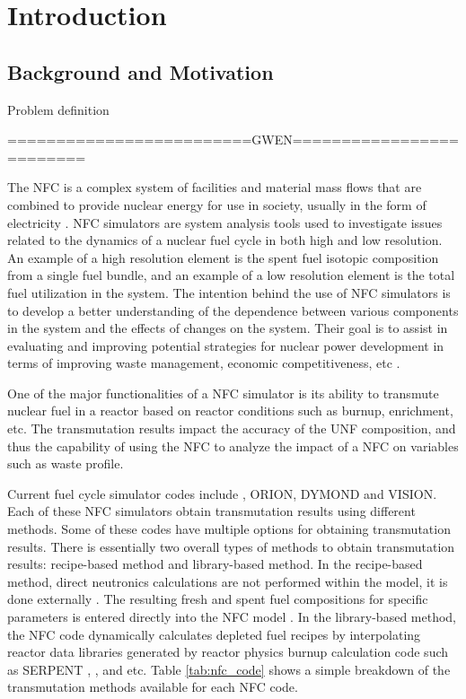 \section{Introduction}
\subsection{Background and Motivation}
Problem definition

=========================GWEN=========================

The \gls{NFC} is a complex system of facilities and material 
mass flows that are combined to provide nuclear energy for use 
in society, usually in the form of electricity 
\cite{yacout_modeling_2005}. 
\gls{NFC} simulators are system analysis tools used to investigate 
issues related to the dynamics of a nuclear fuel cycle in both 
high and low resolution. 
An example of a high resolution element is the spent fuel 
isotopic composition from a single fuel bundle, and an example 
of a low resolution element is the total fuel utilization in 
the system. 
The intention behind the use of \gls{NFC} simulators is to develop 
a better understanding of the dependence between various components 
in the system and the effects of changes on the system. 
Their goal is to assist in evaluating and improving potential 
strategies for nuclear power development in terms of improving waste 
management, economic competitiveness, etc \cite{yacout_modeling_2005}.   

One of the major functionalities of a \gls{NFC} simulator is its 
ability to transmute nuclear fuel in a reactor based on reactor 
conditions such as burnup, enrichment, etc. 
The transmutation results impact the accuracy of the \gls{UNF} 
composition, and thus the capability of using the \gls{NFC} to 
analyze the impact of a \gls{NFC} on variables such as waste profile.  

Current fuel cycle simulator codes include \Cyclus, ORION, DYMOND 
and VISION. 
Each of these NFC simulators obtain transmutation results using 
different methods. 
Some of these codes have multiple options for obtaining 
transmutation results. 
There is essentially two overall types of methods to obtain transmutation 
results: recipe-based method and library-based method. 
In the recipe-based method, direct neutronics calculations are not performed 
within the model, it is done externally \cite{yacout_vision_2006}. 
The resulting fresh and spent fuel compositions for specific parameters 
is entered directly into the \gls{NFC} model \cite{sunny_transition_2015}. 
In the library-based method,  the \gls{NFC} code dynamically calculates depleted 
fuel recipes by interpolating reactor data libraries generated by
reactor physics burnup calculation code such as SERPENT 
\cite{leppanen_serpent_2013}, \cite{ORIGEN} \cite{croff_users_1980}, and etc. 
Table \ref{tab:nfc_code} shows a simple breakdown of the 
transmutation methods available for each \gls{NFC} code. 

